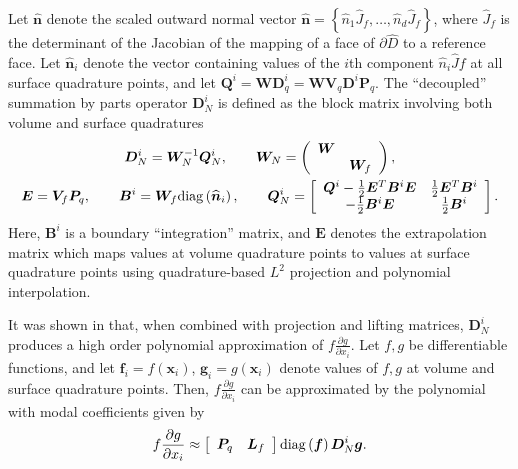 \documentclass{svjour3}                     %
\renewcommand{\hat}{\widehat}
\newcommand{\diag}[1]{{\rm diag}\LRp{#1}}
\newcommand{\pd}[2]{\frac{\partial#1}{\partial#2}}
\newcommand{\LRp}[1]{\left( #1 \right)}
\newcommand{\LRs}[1]{\left[ #1 \right]}
\newcommand{\LRc}[1]{\left\{ #1 \right\}}
\begin{document}
Let $\hat{\bm{n}}$ denote the scaled outward normal vector $\hat{\bm{n}} = \LRc{\hat{n}_1\hat{J}_f,\ldots,\hat{n}_d\hat{J}_f}$, where $\hat{J}_f$ is the determinant of the Jacobian of the mapping of a face of $\partial \hat{D}$ to a reference face.  Let $\hat{\bm{n}}_i$ denote the vector containing values of the $i$th component $\hat{n}_i\hat{J}f$ at all surface quadrature points, and let $\bm{Q}^i = \bm{W}\bm{D}^i_q = \bm{W}\bm{V}_q\bm{D}^i\bm{P}_q$.  The ``decoupled'' summation by parts operator $\bm{D}^i_N$ is defined as the block matrix involving both volume and surface quadratures
\begin{gather}
\bm{D}^i_N = \bm{W}_N^{-1} \bm{Q}^i_N, \qquad \bm{W}_N = \LRp{\begin{array}{cc}\bm{W}&\\ & \bm{W}_f\end{array}}, \label{eq:QN}\\
\bm{E} = \bm{V}_f\bm{P}_q, \qquad \bm{B}^i = \bm{W}_f \diag{\hat{\bm{n}}_i}, \qquad \bm{Q}^i_N  = \LRs{
\begin{array}{cc}
\bm{Q}^i - \frac{1}{2}\bm{E}^T\bm{B}^i\bm{E} &  \frac{1}{2}\bm{E}^T\bm{B}^i\\
-\frac{1}{2}\bm{B}^i\bm{E} & \frac{1}{2} \bm{B}^i
\end{array}}.  \nonumber
\end{gather}
Here, $\bm{B}^i$ is a boundary ``integration'' matrix, and $\bm{E}$ denotes the extrapolation matrix which maps values at volume quadrature points to values at surface quadrature points using quadrature-based $L^2$ projection and polynomial interpolation.  

It was shown in \cite{chan2017discretely, chan2018efficient} that, when combined with projection and lifting matrices, $\bm{D}^i_N$ produces a high order polynomial approximation of $f\pd{g}{x_i}$. 
Let $f, g$ be differentiable functions, and let $\bm{f}_i = f(\bm{x}_i)$, $\bm{g}_i = g(\bm{x}_i)$ denote values of $f,g$ at volume and surface quadrature points.  Then, $f\pd{g}{x_i}$ can be approximated by the polynomial with modal coefficients given by
\begin{gather}
f\pd{g}{x_i} \approx \LRs{\begin{array}{cc}
\bm{P}_q & \bm{L}_f\end{array}} {\rm diag}\LRp{\bm{f}}\bm{D}^i_N \bm{g}.  
\label{eq:dnapprox}
\end{gather}
\end{document}
